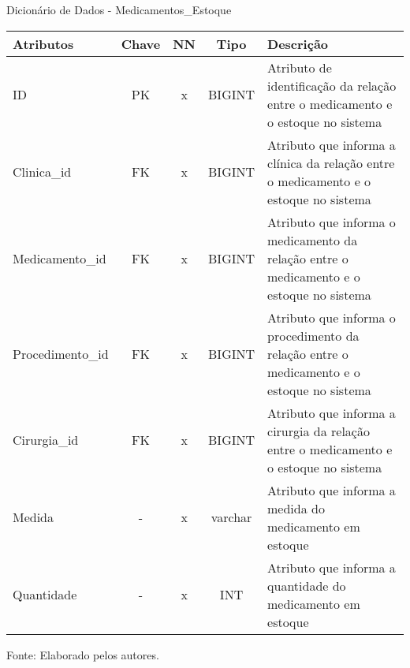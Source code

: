 \documentclass[
    12pt,               %
    openright,          %
    oneside,
    a4paper,            %
    BIBLATEX,           %
    TODO,               %
    english,            %
    brazil              %
    ]{ifsp-spo-inf-ctds}
\begin{document}
              \begin{center}
                \begin{quadro}[H]
                \centering
                        \caption{Dicionário de Dados - Medicamentos\_Estoque}
                          \begin{tabulary}{1.0\textwidth}{|p{9em}|c|c|c|p{19em}|}
                    \hline
                    Atributos & Chave & NN & Tipo & Descrição\\
                    \hline
                    ID & PK & x & BIGINT & Atributo de identificação da relação entre o medicamento e o estoque no sistema \\
                    \hline
                    Clinica\_id & FK & x & BIGINT & Atributo que informa a clínica da relação entre o medicamento e o estoque no sistema\\
                    \hline
                    Medicamento\_id & FK & x & BIGINT & Atributo que informa o medicamento da relação entre o medicamento e o estoque no sistema\\
                    \hline
                    Procedimento\_id & FK & x & BIGINT & Atributo que informa o procedimento da relação entre o medicamento e o estoque no sistema\\
                    \hline
                    Cirurgia\_id & FK & x & BIGINT & Atributo que informa a cirurgia da relação entre o medicamento e o estoque no sistema\\
                    \hline
                    Medida & - & x & varchar & Atributo que informa a medida do medicamento em estoque\\
                    \hline
                    Quantidade & - & x & INT & Atributo que informa a quantidade do medicamento em estoque\\
                    \hline
                    \end{tabulary}

                        \label{qd: md-medicamento-estoque}
                        \centering
                {\footnotesize Fonte: Elaborado pelos autores.}
                      \end{quadro}
                    \end{center}
\end{document}
